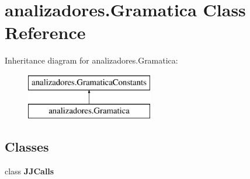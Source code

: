 \hypertarget{classanalizadores_1_1_gramatica}{}\section{analizadores.\+Gramatica Class Reference}
\label{classanalizadores_1_1_gramatica}
Inheritance diagram for analizadores.\+Gramatica\+:\begin{figure}[H]
\begin{center}
\leavevmode
\includegraphics[height=2.000000cm]{classanalizadores_1_1_gramatica}
\end{center}
\end{figure}
\subsection*{Classes}
\begin{DoxyCompactItemize}
\item 
class {\bfseries J\+J\+Calls}
\end{DoxyCompactItemize}
